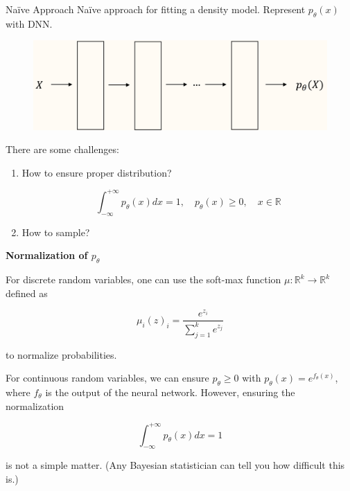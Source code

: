 \begin{frame}[allowframebreaks]

\begin{myconceptblock}{10.4}{Naïve Approach}
    Naïve approach for fitting a density model. Represent $p_{\theta}(x)$ with DNN.

    \begin{figure}[H]
        \centering
        \includegraphics[width=1.0\textwidth]{.././assets/10.5.png}
    \end{figure}

    There are some challenges:

    \begin{enumerate}
        \item
        How to ensure proper distribution?

        $$
        \int_{-\infty}^{+\infty} p_{\theta}(x) d x=1, \quad p_{\theta}(x) \geq 0, \quad x \in \mathbb{R}
        $$
        \item How to sample?
    \end{enumerate}

    \par\noindent\textcolor{gray}{\hdashrule{\textwidth}{0.4pt}{1pt 2pt}}

    \textbf{Normalization of $p_{\theta}$}

    For discrete random variables, one can use the soft-max function $\mu: \mathbb{R}^{k} \rightarrow \mathbb{R}^{k}$ defined as

    $$
    \mu_{i}(z)_{i}=\frac{e^{z_{i}}}{\sum_{j=1}^{k} e^{z_{j}}}
    $$

    to normalize probabilities.

    For continuous random variables, we can ensure $p_{\theta} \geq 0$ with $p_{\theta}(x)=e^{f_{\theta}(x)}$, where $f_{\theta}$ is the output of the neural network. However, ensuring the normalization

    $$
    \int_{-\infty}^{+\infty} p_{\theta}(x) d x=1
    $$

    is not a simple matter. (Any Bayesian statistician can tell you how difficult this is.)


\end{myconceptblock}
\end{frame}
